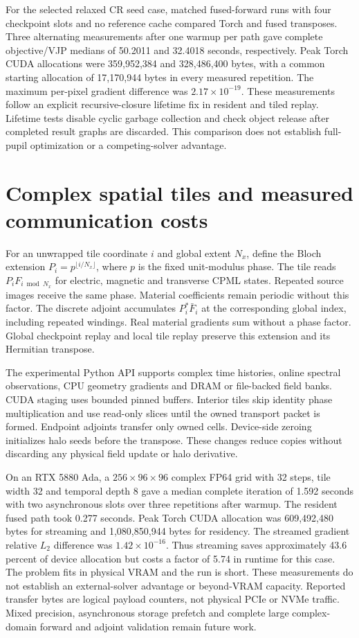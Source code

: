\documentclass[11pt,a4paper]{article}
\begin{document}
For the selected relaxed CR seed case, matched fused-forward runs with four
checkpoint slots and no reference cache compared Torch and fused transposes.
Three alternating measurements after one warmup per path gave complete
objective/VJP medians of 50.2011 and 32.4018 seconds, respectively. Peak Torch
CUDA allocations were 359,952,384 and 328,486,400 bytes, with a common starting
allocation of 17,170,944 bytes in every measured repetition. The maximum
per-pixel gradient difference was $2.17\times10^{-19}$. These measurements
follow an explicit recursive-closure lifetime fix in resident and tiled
replay. Lifetime tests disable cyclic garbage collection and check object
release after completed result graphs are discarded. This comparison does
not establish full-pupil optimization or a competing-solver advantage.

\section{Complex spatial tiles and measured communication costs}
For an unwrapped tile coordinate $i$ and global extent $N_x$, define the
Bloch extension $P_i=p^{\lfloor i/N_x\rfloor}$, where $p$ is the fixed
unit-modulus phase. The tile reads $P_i F_{i\bmod N_x}$ for electric,
magnetic and transverse CPML states. Repeated source images receive the
same phase. Material coefficients remain periodic without this factor.
The discrete adjoint accumulates $P_i^*\bar F_i$ at the corresponding
global index, including repeated windings. Real material gradients sum
without a phase factor. Global checkpoint replay and local tile replay
preserve this extension and its Hermitian transpose.

The experimental Python API supports complex time histories, online spectral
observations, CPU geometry gradients and DRAM or file-backed field banks.
CUDA staging uses bounded pinned buffers. Interior tiles skip identity phase
multiplication and use read-only slices until the owned transport packet is
formed. Endpoint adjoints transfer only owned cells. Device-side zeroing
initializes halo seeds before the transpose. These changes reduce copies
without discarding any physical field update or halo derivative.

On an RTX 5880 Ada, a $256\times96\times96$ complex FP64 grid with 32 steps,
tile width 32 and temporal depth 8 gave a median complete iteration of
1.592 seconds with two asynchronous slots over three repetitions after
warmup. The resident fused path took 0.277 seconds. Peak Torch CUDA
allocation was 609,492,480 bytes for streaming and 1,080,850,944 bytes for
residency. The streamed gradient relative $L_2$ difference was
$1.42\times10^{-16}$. Thus streaming saves approximately 43.6 percent of
device allocation but costs a factor of 5.74 in runtime for this case.
The problem fits in physical VRAM and the run is short. These measurements
do not establish an external-solver advantage or beyond-VRAM capacity.
Reported transfer bytes are logical payload counters, not physical PCIe
or NVMe traffic. Mixed precision, asynchronous storage prefetch and
complete large complex-domain forward and adjoint validation remain future work.
\end{document}

